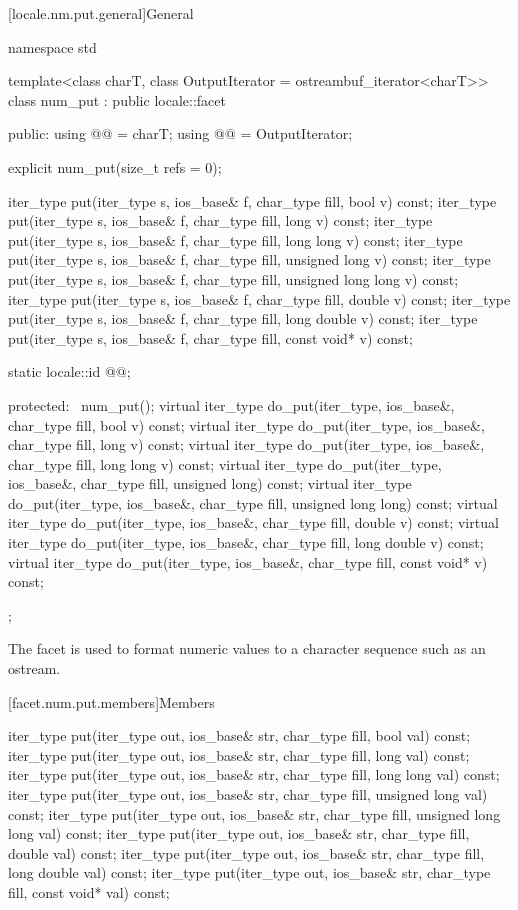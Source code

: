 [locale.nm.put.general]{General}

%
\begin{codeblock}
namespace std {
  template<class charT, class OutputIterator = ostreambuf_iterator<charT>>
  class num_put : public locale::facet {
  public:
    using @@ = charT;
    using @@ = OutputIterator;

    explicit num_put(size_t refs = 0);

    iter_type put(iter_type s, ios_base& f, char_type fill, bool v) const;
    iter_type put(iter_type s, ios_base& f, char_type fill, long v) const;
    iter_type put(iter_type s, ios_base& f, char_type fill, long long v) const;
    iter_type put(iter_type s, ios_base& f, char_type fill, unsigned long v) const;
    iter_type put(iter_type s, ios_base& f, char_type fill, unsigned long long v) const;
    iter_type put(iter_type s, ios_base& f, char_type fill, double v) const;
    iter_type put(iter_type s, ios_base& f, char_type fill, long double v) const;
    iter_type put(iter_type s, ios_base& f, char_type fill, const void* v) const;

    static locale::id @@;

  protected:
    ~num_put();
    virtual iter_type do_put(iter_type, ios_base&, char_type fill, bool v) const;
    virtual iter_type do_put(iter_type, ios_base&, char_type fill, long v) const;
    virtual iter_type do_put(iter_type, ios_base&, char_type fill, long long v) const;
    virtual iter_type do_put(iter_type, ios_base&, char_type fill, unsigned long) const;
    virtual iter_type do_put(iter_type, ios_base&, char_type fill, unsigned long long) const;
    virtual iter_type do_put(iter_type, ios_base&, char_type fill, double v) const;
    virtual iter_type do_put(iter_type, ios_base&, char_type fill, long double v) const;
    virtual iter_type do_put(iter_type, ios_base&, char_type fill, const void* v) const;
  };
}
\end{codeblock}

\pnum
The facet
is used to format numeric values to a character sequence such as an ostream.

[facet.num.put.members]{Members}

%
\begin{itemdecl}
iter_type put(iter_type out, ios_base& str, char_type fill, bool val) const;
iter_type put(iter_type out, ios_base& str, char_type fill, long val) const;
iter_type put(iter_type out, ios_base& str, char_type fill, long long val) const;
iter_type put(iter_type out, ios_base& str, char_type fill, unsigned long val) const;
iter_type put(iter_type out, ios_base& str, char_type fill, unsigned long long val) const;
iter_type put(iter_type out, ios_base& str, char_type fill, double val) const;
iter_type put(iter_type out, ios_base& str, char_type fill, long double val) const;
iter_type put(iter_type out, ios_base& str, char_type fill, const void* val) const;
\end{itemdecl}

